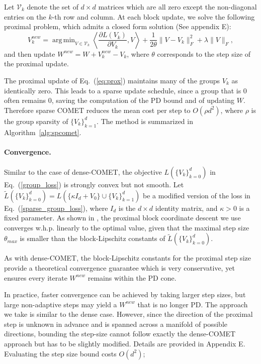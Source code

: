 \documentclass[twoside,11pt]{article}
\newcommand\mat[1]{{#1}}
\newcommand{\W}{\mat{W}}
\newcommand{\Vk}{\mat{V_k}}
\newcommand{\Vg}{\{\Vk\}_{k=0}^{d}} %
\newcommand{\Vgrc}{\{\Vk\}_{k=1}^{d}} %
\renewcommand{\eqref}[1]{Eq.~(\ref{#1})}
\DeclareMathOperator*{\argmin}{arg\,min}
\begin{document}
Let $\mathcal{V}_k$ denote the set of $d \times d$ matrices which are all zero except the non-diagonal entries on the $k$-th row and column. At each block update, we solve the following proximal problem, which admits a closed form solution \citep{bach2012optimization} (See appendix E):
\begin{equation}\label{eq:prox}
V_k^{new} = \argmin_{\mat{V} \in \mathcal{V}_k} \left\langle \frac{\partial{L (V_k)}}{\partial V_k}, \mat{V} \right\rangle + \frac{1}{2\theta}\|V - V_k\|_F^2 + \lambda \|V\|_F,
\end{equation}
and then update $\W^{new} = \W + V_k^{new} - V_k$, where $\theta$ corresponds to the step size of the proximal update.

The proximal update of \eqref{eq:prox} maintains many of the groups $V_k$ as identically zero. This leads to a sparse update schedule, since a group that is $0$ often remains $0$, saving the computation of the PD bound and of updating $\W$. Therefore sparse COMET reduces the mean cost per step to $O(\rho d^2)$, where $\rho$ is the group sparsity of $\Vgrc$. The method is summarized in Algorithm~\ref{alg:spcomet}.

\paragraph{Convergence.}
Similar to the case of dense-COMET, the objective $L(\Vg)$ in \eqref{group_loss} is strongly convex but not smooth. Let $\tilde{L}(\Vg) = L(\{\kappa I_d + V_0\} \cup \{V_k\}_{k=1}^d)$ be a modified version of the loss in \eqref{sparse_group_loss}, where $I_d$ is the $d \times d$ identity matrix, and $\kappa>0$ is a fixed parameter.
As shown in \cite[Theorem 7]{richtarik2014iteration}, the proximal block coordinate descent we use converges w.h.p. linearly to the optimal value, given that the maximal step size $\theta_{max}$ is smaller than the block-Lipschitz constants of $\tilde{L}(\Vg)$. 

As with dense-COMET, the block-Lipschitz constants for the proximal step size provide a theoretical convergence guarantee which is very conservative, yet ensures every iterate $\W^{new}$ remains within the PD cone.

In practice, faster convergence can be achieved by taking larger step sizes, but large non-adaptive steps may yield a  $\W^{new}$ that is no longer PD. The approach we take is similar to the dense case. However, since the direction of the proximal step is unknown in advance and is spanned across a manifold of possible directions, bounding the step-size cannot follow exactly the dense-COMET approach but has to be slightly modified. Details are provided in Appendix E. Evaluating the step size bound costs $O(d^2)$;  
\end{document}
